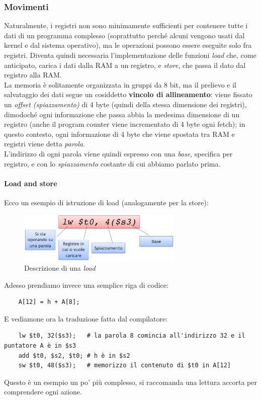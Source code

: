 \documentclass[class=book, crop=false]{standalone}
\begin{document}
\subsubsection{Movimenti}Naturalmente, i registri non sono minimamente sufficienti per contenere tutte i dati di un programma complesso (soprattutto perché alcuni vengono usati dal kernel e dal sistema operativo), ma le operazioni possono essere eseguite solo fra registri. Diventa quindi necessaria l'implementazione delle funzioni \emph{load} che, come anticipato, carica i dati dalla RAM a un registro, e \emph{store}, che passa il dato dal registro alla RAM.\\
La memoria è solitamente organizzata in gruppi da 8 bit, ma il prelievo e il salvataggio dei dati segue un cosiddetto \textbf{vincolo di allineamento}: viene fissato un \emph{offset (spiazzamento)} di 4 byte (quindi della stessa dimensione dei registri), dimodoché ogni informazione che passa abbia la medesima dimensione di un registro (anche il program counter viene incrementato di 4 byte ogni fetch); in questo contesto, ogni informazione di 4 byte che viene spostata tra RAM e registri viene detta \emph{parola}.\\
L'indirizzo di ogni parola viene quindi espresso con una \emph{base}, specifica per registro, e con lo \emph{spiazzamento} costante di cui abbiamo parlato prima.

\paragraph{Load and store}
Ecco un esempio di istruzione di load (analogamente per la store):
\begin{figure}[H]
	\centering
	\includegraphics[width=0.7\textwidth,keepaspectratio]{load}
	\caption{Descrizione di una \emph{load}}
\end{figure}
Adesso prendiamo invece una semplice riga di codice:
\begin{verbatim}
	A[12] = h + A[8];
\end{verbatim}
E vediamone ora la traduzione fatta dal compilatore:
\begin{verbatim}
	lw $t0, 32($s3);   # la parola 8 comincia all'indirizzo 32 e il puntatore A è in $s3
	add $t0, $s2, $t0; # h è in $s2
	sw $t0, 48($s3);   # memorizzo il contenuto di $t0 in A[12]
\end{verbatim}
Questo è un esempio un po' più complesso, si raccomanda una lettura accorta per comprendere ogni azione.
\end{document}
